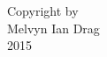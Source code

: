 \setcounter{page}{2}
\vspace*{\fill}
\begin{center}
Copyright by\\
Melvyn Ian Drag\\
2015
\end{center}
\vspace*{\fill}
